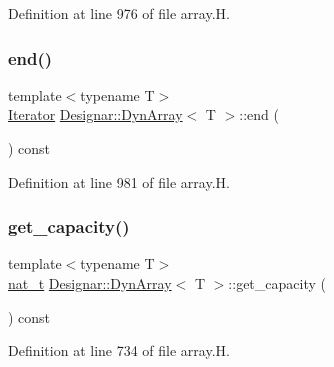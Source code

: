 Definition at line 976 of file array.\+H.

\mbox{\label{class_designar_1_1_dyn_array_ab2ff81ff5bfeefbcd0a302da9effff89}} 
\subsubsection{\texorpdfstring{end()}{end()}\hspace{0.1cm}{\footnotesize\ttfamily [2/2]}}
{\footnotesize\ttfamily template$<$typename T$>$ \\
\hyperlink{class_designar_1_1_dyn_array_1_1_iterator}{Iterator} \hyperlink{class_designar_1_1_dyn_array}{Designar\+::\+Dyn\+Array}$<$ T $>$\+::end (\begin{DoxyParamCaption}{ }\end{DoxyParamCaption}) const\hspace{0.3cm}{\ttfamily [inline]}}



Definition at line 981 of file array.\+H.

\mbox{\label{class_designar_1_1_dyn_array_afa027281e5790d05269d5972ec2ea177}} 
\subsubsection{\texorpdfstring{get\+\_\+capacity()}{get\_capacity()}}
{\footnotesize\ttfamily template$<$typename T$>$ \\
\hyperlink{namespace_designar_aa72662848b9f4815e7bf31a7cf3e33d1}{nat\+\_\+t} \hyperlink{class_designar_1_1_dyn_array}{Designar\+::\+Dyn\+Array}$<$ T $>$\+::get\+\_\+capacity (\begin{DoxyParamCaption}{ }\end{DoxyParamCaption}) const\hspace{0.3cm}{\ttfamily [inline]}}



Definition at line 734 of file array.\+H.

\mbox{\label{class_designar_1_1_dyn_array_a85d8c50ef17c71d675961ba0268c2278}} 
